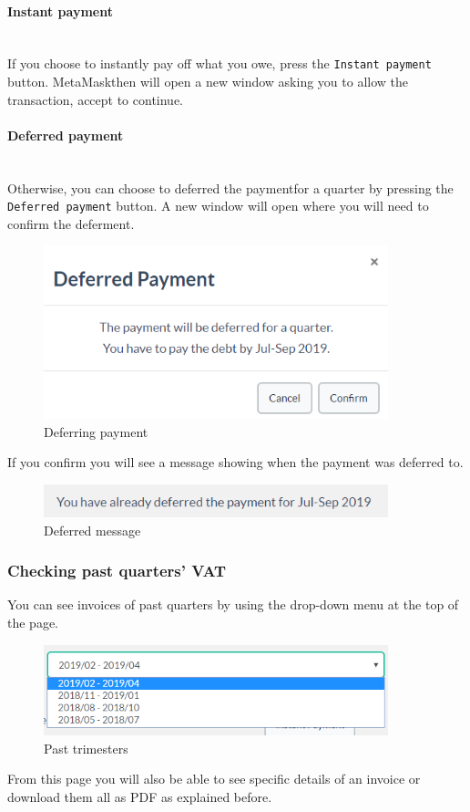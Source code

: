 			\paragraph{Instant payment} \mbox{}\\
			If you choose to instantly pay off what you owe, press the \texttt{Instant 
			payment} button. MetaMask\glosp then will open a new window asking 
			you to allow the 
			transaction, accept to continue.
			\paragraph{Deferred payment} \mbox{}\\
			Otherwise, you can choose to deferred the payment\glosp for a quarter
			 by pressing the \texttt{Deferred payment} button. A new window will open 
			 where you will need to confirm the deferment.
			\begin{figure}[H]
				\includegraphics[width=10cm]{res/images/deferred_payment.png}
				\centering
				\caption{Deferring payment}
			\end{figure}
			\noindent If you confirm you will see a message showing when the
			payment was deferred to.
			\begin{figure}[H]
				\includegraphics[width=10cm]{res/images/deferred_message.png}
				\centering
				\caption{Deferred message}
			\end{figure}
%
		\subsubsection{Checking past quarters' VAT}
		You can see invoices of past quarters by using the drop-down 
		menu at the top of the page.
		\begin{figure}[H]
			\includegraphics[width=10cm]{res/images/past_trimesters.png}
			\centering
			\caption{Past trimesters}
		\end{figure}
		\noindent From this page you will also be able to see specific details 
		of an invoice or download them all as PDF as explained before.